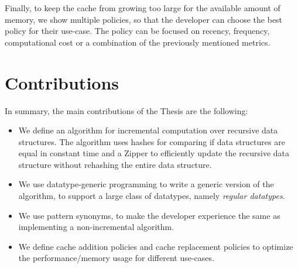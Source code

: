 Finally, to keep the cache from growing too large for the available amount of memory, we show multiple policies, so that the developer can choose the best policy for their use-case. The policy can be focused on recency, frequency, computational cost or a combination of the previously mentioned metrics.

\newpage
\section{Contributions}

In summary, the main contributions of the Thesis are the following:

\begin{itemize}
    \item We define an algorithm for incremental computation over recursive data structures. The algorithm uses hashes for comparing if data structures are equal in constant time and a Zipper to efficiently update the recursive data structure without rehashing the entire data structure.
    \item We use datatype-generic programming to write a generic version of the algorithm, to support a large class of datatypes, namely \textit{regular datatypes}.
    \item We use pattern synonyms, to make the developer experience the same as implementing a non-incremental algorithm.
    \item We define cache addition policies and cache replacement policies to optimize the performance/memory usage for different use-cases.
\end{itemize}



